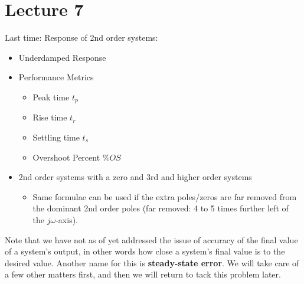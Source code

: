 \documentclass{book}
\newcommand{\jw}{j\omega}
\begin{document}
\chapter*{Lecture 7}
Last time: Response of 2nd order systems:
\begin{itemize}
	\item Underdamped Response
	\item Performance Metrics
	\begin{itemize}
		\item Peak time $ t_p $
		\item Rise time $ t_r $
		\item Settling time $ t_s $
		\item Overshoot Percent $ \%OS $
	\end{itemize}
	\item 2nd order systems with a zero and 3rd and higher order systems
	\begin{itemize}
		\item Same formulae can be used if the extra poles/zeros are far removed from the dominant 2nd order poles (far removed: 4 to 5 times further left of the $ \jw $-axis).
	\end{itemize}
\end{itemize}
Note that we have not as of yet addressed the issue of accuracy of the final value of a system's output, in other words how close a system's final value is to the desired value. Another name for this is \textbf{steady-state error}. We will take care of a few other matters first, and then we will return to tack this problem later.
\end{document}
